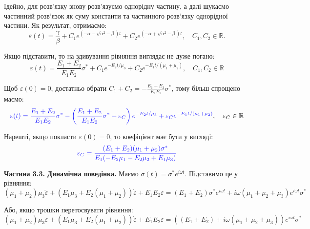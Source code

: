 \documentclass{hw_template}
\begin{document}
Ідейно, для розв'язку знову розв'язуємо однорідну частину, а далі шукаємо частинний розв'язок як суму константи та частинного розв'язку однорідної частини. Як результат, отримаємо:
\begin{equation*}
    \varepsilon(t) = \frac{\gamma}{\beta} + C_1e^{(-\alpha-\sqrt{\alpha^2-\beta})t} + C_2e^{(-\alpha+\sqrt{\alpha^2-\beta})t}, \quad C_1,C_2 \in \mathbb{R}.
\end{equation*}

Якщо підставити, то на здивування рівняння виглядає не дуже погано:
\begin{equation*}
    \varepsilon(t) = \frac{E_1+E_2}{E_1E_2}\sigma^* + C_1e^{-E_2t/\mu_3} + C_2e^{-E_1t/(\mu_1+\mu_2)}, \quad C_1, C_2 \in \mathbb{R}
\end{equation*}

Щоб $\varepsilon(0) = 0$, достатньо обрати $C_1+C_2=-\frac{E_1+E_2}{E_1E_2}\sigma^*$, тому більш спрощено маємо:
\begin{equation*}
    \textcolor{blue!90!white}{\varepsilon(t) = \frac{E_1+E_2}{E_1E_2}\sigma^* - \left(\frac{E_1+E_2}{E_1E_2}\sigma^*+ \varepsilon_C\right)e^{-E_2t/\mu_3} + \varepsilon_C e^{-E_1t/(\mu_1+\mu_2)}}, \quad \varepsilon_C \in \mathbb{R}
\end{equation*}

Нарешті, якщо покласти $\dot{\varepsilon}(0)=0$, то коефіцієнт має бути у вигляді:
\begin{equation*}
    \textcolor{blue!90!white}{\varepsilon_C = \frac{(E_1+E_2)(\mu_1+\mu_2)\sigma^*}{E_1(-E_2\mu_1-E_2\mu_2+E_1\mu_3)}}
\end{equation*} 

\textcolor{blue!90!white}{\textbf{Частина 3.3. Динамічна поведінка.}} Маємо $\sigma(t) = \sigma^* e^{i\omega t}$. Підставимо це у рівняння:
\begin{equation*}
    (\mu_1+\mu_2)\mu_3\ddot{\varepsilon} + (E_1\mu_3 + E_2(\mu_1+\mu_2))\dot{\varepsilon} + E_1E_2\varepsilon = (E_1 + E_2)\sigma^*e^{i\omega t} + i\omega\left(\mu_1+\mu_2+\mu_3\right)e^{i\omega t}\sigma^*
\end{equation*}

Або, якщо трошки перетосвувати рівняння:
\begin{equation*}
    (\mu_1+\mu_2)\mu_3\ddot{\varepsilon} + (E_1\mu_3 + E_2(\mu_1+\mu_2))\dot{\varepsilon} + E_1E_2\varepsilon = \left((E_1 + E_2) + i\omega\left(\mu_1+\mu_2+\mu_3\right)\right)e^{i\omega t}\sigma^*
\end{equation*}
\end{document}
